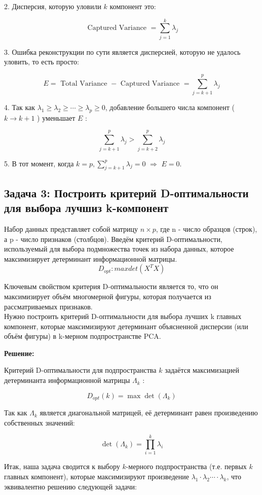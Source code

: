 2. Дисперсия, которую уловили $k$ компонент это:

$$
\text { Captured Variance }=\sum_{j=1}^k \lambda_j
$$

3. Ошибка реконструкции по сути является дисперсией, которую не удалось уловить, то есть просто:

$$
E=\text { Total Variance }- \text { Captured Variance }=\sum_{j=k+1}^p \lambda_j
$$

4. Так как $\lambda_1 \geq \lambda_2 \geq \cdots \geq \lambda_p \geq 0$, добавление большего числа компонент ( $k \rightarrow k+1$ ) уменьшает $E$ :

$$
\sum_{j=k+1}^p \lambda_j>\sum_{j=k+2}^p \lambda_j
$$

5. В тот момент, когда $k=p, \sum_{j=k+1}^p \lambda_j=0$ $\Rightarrow$ $E=0$.

\subsection{Задача 3: Построить критерий D-оптимальности для выбора лучшиз k-компонент }
Набор данных представляет собой матрицу $n \times p$, где n - число образцов (строк), а p - число признаков (столбцов). Введём критерий D-оптимальности, используемый для выбора подмножества точек из набора данных, которое максимизирует детерминант информационной матрицы.
$$
D_{opt} : max  det(X^{T}X)
$$

Ключевым свойством критерия D-оптимальности является то, что он максимизирует объём многомерной фигуры, которая получается из рассматриваемых признаков. \\
Нужно построить критерий D-оптимальности для выбора лучших 
k главных компонент, которые максимизируют детерминант объясненной дисперсии (или объём фигуры) в k-мерном подпространстве PCA. 

\textbf{Решение:}

Критерий D-оптимальности для подпространства $k$ задаётся максимизацией детерминанта информационной матрицы $\Lambda_k$ :

$$
D_{o p t}(k)=\max \operatorname{det}\left(\Lambda_k\right)
$$

Так как $\Lambda_k$ является диагональной матрицей, её детерминант равен произведению собственных значений:

$$
\operatorname{det}\left(\Lambda_k\right)=\prod_{i=1}^k \lambda_i
$$

Итак, наша задача сводится к выбору $k$-мерного подпространства (т.е. первых $k$ главных компонент), которые максимизируют произведение $\lambda_1 \cdot \lambda_2 \cdots \cdot \lambda_k$, что эквивалентно решению следующей задачи:

